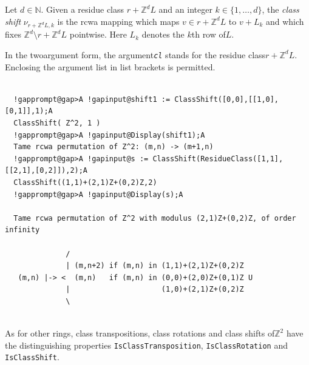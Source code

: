 \documentclass[a4paper,11pt]{report}
\begin{document}
{{{ Let $d \in {\ensuremath{\mathbb N}}$. Given a residue class $r+{\ensuremath{\mathbb Z}}^dL$ and an integer $k \in \{1, \dots, d\}$, the \emph{class shift} $\nu_{r+{\ensuremath{\mathbb Z}}^dL,k}$ is the rcwa mapping which maps $v \in r+{\ensuremath{\mathbb Z}}^dL$ to $v + L_k$ and which fixes ${\ensuremath{\mathbb Z}}^d \setminus r+{\ensuremath{\mathbb Z}}^dL$ pointwise. Here $L_k$ denotes the $k$th row of{\nobreakspace}$L$. 

 In the two\texttt{}argument form, the argument{\nobreakspace}\mbox{\texttt{\mdseries\slshape cl}} stands for the residue class{\nobreakspace}$r+{\ensuremath{\mathbb Z}}^dL$. Enclosing the argument list in list brackets is permitted. 
\begin{Verbatim}[commandchars=!@A,fontsize=\small,frame=single,label=Example]
  
  !gapprompt@gap>A !gapinput@shift1 := ClassShift([0,0],[[1,0],[0,1]],1);A
  ClassShift( Z^2, 1 )
  !gapprompt@gap>A !gapinput@Display(shift1);A
  Tame rcwa permutation of Z^2: (m,n) -> (m+1,n)
  !gapprompt@gap>A !gapinput@s := ClassShift(ResidueClass([1,1],[[2,1],[0,2]]),2);A
  ClassShift((1,1)+(2,1)Z+(0,2)Z,2)
  !gapprompt@gap>A !gapinput@Display(s);A
  
  Tame rcwa permutation of Z^2 with modulus (2,1)Z+(0,2)Z, of order infinity
  
              /
              | (m,n+2) if (m,n) in (1,1)+(2,1)Z+(0,2)Z
   (m,n) |-> <  (m,n)   if (m,n) in (0,0)+(2,0)Z+(0,1)Z U 
              |                     (1,0)+(2,1)Z+(0,2)Z
              \
  
\end{Verbatim}
 }

    As for other rings, class transpositions, class rotations and class shifts
of{\nobreakspace}${\ensuremath{\mathbb Z}}^2$ have the distinguishing properties \texttt{IsClassTransposition}, \texttt{IsClassRotation} and \texttt{IsClassShift}. }

  
}
\end{document}
